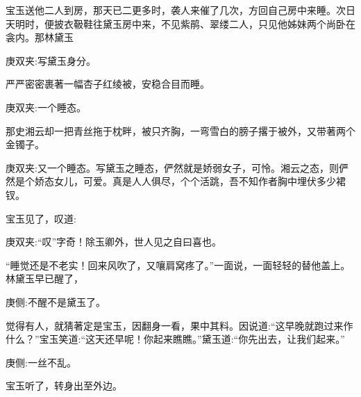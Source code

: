 \begin{parag}
    宝玉送他二人到房，那天已二更多时，袭人来催了几次，方回自己房中来睡。次日天明时，便披衣靸鞋往黛玉房中来，不见紫鹃、翠缕二人，只见他姊妹两个尚卧在衾内。那林黛玉\begin{note}庚双夹:写黛玉身分。\end{note}严严密密裹著一幅杏子红绫被，安稳合目而睡。\begin{note}庚双夹:一个睡态。\end{note}那史湘云却一把青丝拖于枕畔，被只齐胸，一弯雪白的膀子撂于被外，又带著两个金镯子。\begin{note}庚双夹:又一个睡态。写黛玉之睡态，俨然就是娇弱女子，可怜。湘云之态，则俨然是个娇态女儿，可爱。真是人人俱尽，个个活跳，吾不知作者胸中埋伏多少裙钗。\end{note}宝玉见了，叹道:\begin{note}庚双夹:“叹”字奇！除玉卿外，世人见之自曰喜也。\end{note}“睡觉还是不老实！回来风吹了，又嚷肩窝疼了。”一面说，一面轻轻的替他盖上。林黛玉早已醒了，\begin{note}庚侧:不醒不是黛玉了。\end{note}觉得有人，就猜著定是宝玉，因翻身一看，果中其料。因说道:“这早晚就跑过来作什么？”宝玉笑道:“这天还早呢！你起来瞧瞧。”黛玉道:“你先出去，让我们起来。”\begin{note}庚侧:一丝不乱。\end{note}宝玉听了，转身出至外边。
\end{parag}


